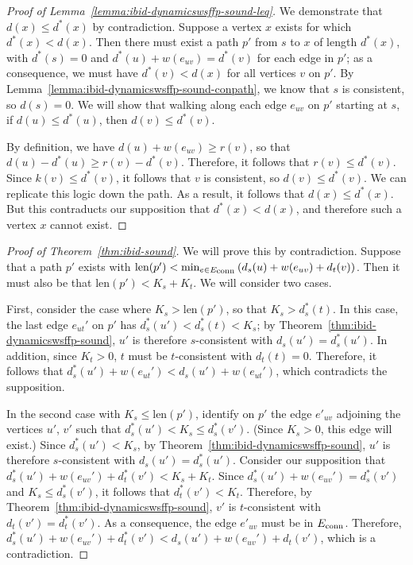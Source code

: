 \begin{proof}[Proof of Lemma~\ref{lemma:ibid-dynamicswsffp-sound-leq}]
We demonstrate that $d(x) \leq d^*(x)$ by contradiction.
Suppose a vertex $x$ exists for which $d^*(x) < d(x)$.
Then there must exist a path $p'$ from $s$ to $x$ of length $d^*(x)$,
with $d^*(s) = 0$ and $d^*(u) + w(e_{uv}) = d^*(v)$ for each edge
in $p'$;
as a consequence,
we must have $d^*(v) < d(x)$ for all vertices $v$ on $p'$.
By Lemma~\ref{lemma:ibid-dynamicswsffp-sound-conpath},
we know that $s$ is consistent,
so $d(s) = 0$.
We will show that walking along
each edge $e_{uv}$ on $p'$ starting at $s$,
if $d(u) \leq d^*(u)$,
then $d(v) \leq d^*(v)$.

By definition,
we have $d(u) + w(e_{uv}) \geq r(v)$,
so that $d(u) - d^*(u) \geq r(v) - d^*(v)$.
Therefore,
it follows that $r(v) \leq d^*(v)$.
Since $k(v) \leq d^*(v)$,
it follows that $v$ is consistent,
so $d(v) \leq d^*(v)$.
We can replicate this logic down the path.
As a result,
it follows that $d(x) \leq d^*(x)$.
But this contraducts our supposition that $d^*(x) < d(x)$,
and therefore such a vertex $x$ cannot exist.
\end{proof}


\begin{proof}[Proof of Theorem~\ref{thm:ibid-sound}]
We will prove this by contradiction.
Suppose that a path $p'$ exists with
$\mbox{len}(p') < \min_{e \in E_{\mbox{\scriptsize conn}}} \left( d_s(u) + w(e_{uv}) + d_t(v) \right)$.
Then it must also be that
$\mbox{len}(p') < K_s + K_t$.
We will consider two cases.

First, consider the case where $K_s > \mbox{len}(p')$,
so that $K_s > d_s^*(t)$.
In this case,
the last edge $e_{ut}'$ on $p'$
has $d_s^*(u') < d_s^*(t) < K_s$;
by Theorem~\ref{thm:ibid-dynamicswsffp-sound},
$u'$ is therefore $s$-consistent with $d_s(u') = d_s^*(u')$.
In addition,
since $K_t > 0$,
$t$ must be $t$-consistent with $d_t(t) = 0$.
Therefore,
it follows that $d_s^*(u') + w(e_{ut}') < d_s(u') + w(e_{ut}')$,
which contradicts the supposition.

In the second case with $K_s \leq \mbox{len}(p')$,
identify on $p'$ the edge $e'_{uv}$ adjoining the vertices $u'$, $v'$
such that $d_s^*(u') < K_s \leq d_s^*(v')$.
(Since $K_s > 0$, this edge will exist.)
Since $d_s^*(u') < K_s$,
by Theorem~\ref{thm:ibid-dynamicswsffp-sound},
$u'$ is therefore $s$-consistent with $d_s(u') = d_s^*(u')$.
Consider our supposition that
$d_s^*(u') + w(e_{uv}') + d_t^*(v') < K_s + K_t$.
Since $d_s^*(u') + w(e_{uv}') = d_s^*(v')$
and $K_s \leq d_s^*(v')$,
it follows that
$d_t^*(v') < K_t$.
Therefore,
by Theorem~\ref{thm:ibid-dynamicswsffp-sound},
$v'$ is $t$-consistent with $d_t(v') = d_t^*(v')$.
As a consequence,
the edge $e'_{uv}$ must be in $E_{\mbox{\scriptsize conn}}$.
Therefore,
$d_s^*(u') + w(e_{uv}') + d_t^*(v')
   < d_s(u') + w(e_{uv}') + d_t(v')$,
which is a contradiction.
\end{proof}
